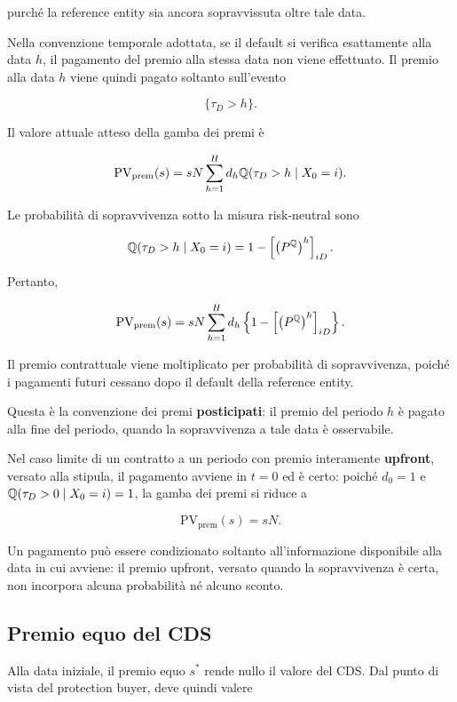 purch\'{e} la reference entity sia ancora sopravvissuta oltre tale
data.

Nella convenzione temporale adottata, se il default si verifica
esattamente alla data $h$, il pagamento del premio alla stessa data
non viene effettuato. Il premio alla data $h$ viene quindi pagato
soltanto sull'evento

\[
\{\tau_D>h\}.
\]

Il valore attuale atteso della gamba dei premi \`{e}

\[
\mathrm{PV}_{\mathrm{prem}}(s)
=
sN
\sum_{h=1}^{H}
d_h
\mathbb{Q}(\tau_D>h\mid X_0=i).
\]

Le probabilit\`{a} di sopravvivenza sotto la misura risk-neutral sono

\[
\mathbb{Q}(\tau_D>h\mid X_0=i)
=
1-
\left[
\left(P^{\mathbb{Q}}\right)^h
\right]_{iD}.
\]

Pertanto,

\[
\mathrm{PV}_{\mathrm{prem}}(s)
=
sN
\sum_{h=1}^{H}
d_h
\left\{
1-
\left[
\left(P^{\mathbb{Q}}\right)^h
\right]_{iD}
\right\}.
\]

Il premio contrattuale viene moltiplicato per probabilit\`{a} di
sopravvivenza, poich\'{e} i pagamenti futuri cessano dopo il default
della reference entity.

Questa \`{e} la convenzione dei premi \textbf{posticipati}: il premio
del periodo $h$ \`{e} pagato alla fine del periodo, quando la
sopravvivenza a tale data \`{e} osservabile.

Nel caso limite di un contratto a un periodo con premio interamente
\textbf{upfront}, versato alla stipula, il pagamento avviene in $t=0$
ed \`{e} certo: poich\'{e} $d_0=1$ e $\mathbb{Q}(\tau_D>0\mid X_0=i)=1$, la
gamba dei premi si riduce a

\[
\mathrm{PV}_{\mathrm{prem}}(s)
=
sN.
\]

Un pagamento pu\`{o} essere condizionato soltanto all'informazione
disponibile alla data in cui avviene: il premio upfront, versato
quando la sopravvivenza \`{e} certa, non incorpora alcuna
probabilit\`{a} n\'{e} alcuno sconto.


\subsection{Premio equo del CDS}

\label{subsec:cap9-cds-premio-equilibrio}

Alla data iniziale, il premio equo $s^{*}$ rende nullo il valore del
CDS. Dal punto di vista del protection buyer, deve quindi valere

